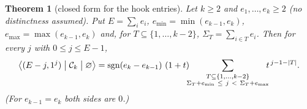 \documentclass[11pt]{article}
\newtheorem{theorem}{Theorem}
\theoremstyle{definition}
\newcommand{\Ck}{\mathcal{C}}
\DeclareMathOperator{\sgn}{sgn}
\begin{document}
\begin{theorem}[closed form for the hook entries]\label{thm:closed}
Let $k\ge2$ and $e_1,\dots,e_k\ge2$ (no distinctness assumed).  Put $E=\sum_ie_i$,
$e_{\min}=\min(e_{k-1},e_k)$, $e_{\max}=\max(e_{k-1},e_k)$ and, for
$T\subseteq\{1,\dots,k-2\}$, $\Sigma_T=\sum_{i\in T}e_i$.  Then for every $j$ with
$0\le j\le E-1$,
\begin{equation}\label{eq:closed}
  \bigl\langle (E-j,1^j)\bigm|\Ck_k\bigm|\varnothing\bigr\rangle
  =\sgn(e_k-e_{k-1})\ (1+t)\!\!\!
   \sum_{\substack{T\subseteq\{1,\dots,k-2\}\\ \Sigma_T+e_{\min}\ \le\ j\ <\ \Sigma_T+e_{\max}}}\!\!\!
   t^{\,j-1-|T|}.
\end{equation}
(For $e_{k-1}=e_k$ both sides are $0$.)
\end{theorem}
\end{document}
